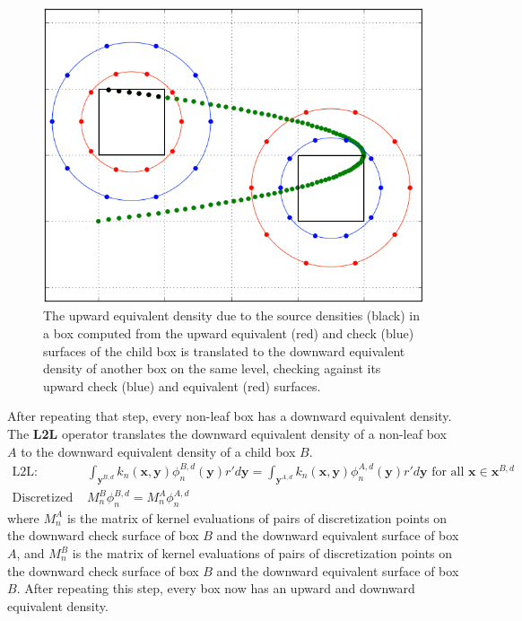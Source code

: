\documentclass[12pt,letterpaper]{article}
\begin{document}
\begin{figure}[!ht]
\begin{center}
\includegraphics[scale=0.5]{M2L-curve}
\end{center}
\caption{The upward equivalent density due to the source densities (black) in a box computed from the upward equivalent (red) and check (blue) surfaces of the child box is translated to the downward equivalent density of another box on the same level, checking against its upward check (blue) and equivalent (red) surfaces.}
\end{figure}

After repeating that step, every non-leaf box has a downward equivalent density. The \textbf{L2L} operator translates the downward equivalent density of a non-leaf box $A$ to the downward equivalent density of a child box $B$.
\begin{align}
\mbox{L2L: }&\int_{\mathbf{y}^{B,d}}{k_n(\mathbf{x},\mathbf{y})}\phi^{B,d}_n{(\mathbf{y})}r'd\mathbf{y}=\int_{\mathbf{y}^{A,d}}{k_n(\mathbf{x},\mathbf{y})}\phi^{A,d}_n{(\mathbf{y})}r'd\mathbf{y}\mbox{ for all }\mathbf{x}\in\mathbf{x}^{B,d}\\
\mbox{Discretized L2L: }&M_n^B\phi^{B,d}_n=M_n^A\phi^{A,d}_n
\end{align}
where $M_n^A$ is the matrix of kernel evaluations of pairs of discretization points on the downward check surface of box $B$ and the downward equivalent surface of box $A$, and $M_n^B$ is the matrix of kernel evaluations of pairs of discretization points on the downward check surface of box $B$ and the downward equivalent surface of box $B$. After repeating this step, every box now has an upward and downward equivalent density.
\end{document}
